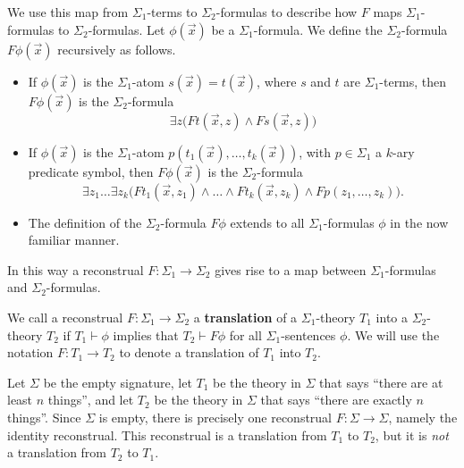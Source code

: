 We use this map from $\Sigma_1$-terms to $\Sigma_2$-formulas to
describe how $F$ maps $\Sigma_1$-formulas to $\Sigma_2$-formulas. Let
$\phi(\vec{x})$ be a $\Sigma_1$-formula. We define the
$\Sigma_2$-formula $F\phi(\vec{x})$ recursively as follows.
\begin{itemize}
\item If $\phi(\vec{x})$ is the $\Sigma_1$-atom $s(\vec{x})=t(\vec{x})$, where $s$ and $t$ are $\Sigma_1$-terms, then $F\phi(\vec{x})$ is the $\Sigma_2$-formula
$$
\exists z\big(Ft(\vec{x}, z)\land Fs(\vec{x}, z)\big)
$$

\item If $\phi(\vec{x})$ is the $\Sigma_1$-atom
  $p(t_1(\vec{x}),\ldots, t_k(\vec{x}))$, with $p\in\Sigma_1$ a
  $k$-ary predicate symbol, then $F\phi(\vec{x})$ is the
  $\Sigma_2$-formula
  \[ \exists z_1\ldots\exists z_k\big(Ft_1(\vec{x},
    z_1)\land\ldots\land Ft_k(\vec{x}, z_k)\land Fp(z_1,\ldots,
    z_k)\big) .\]

\item The definition of the $\Sigma_2$-formula $F\phi$ extends to all
  $\Sigma_1$-formulas $\phi$ in the now familiar manner.
\end{itemize}
In this way a reconstrual $F:\Sigma _1\rightarrow\Sigma _2$ gives rise
to a map between $\Sigma _1$-formulas and $\Sigma _2$-formulas.

\begin{defn} We call a reconstrual $F:\Sigma _1\rightarrow\Sigma _2$ a
  \textbf{translation} of a $\Sigma _1$-theory $T_1$ into a
  $\Sigma _2$-theory $T_2$ if $T_1\vdash\phi$ implies that
  $T_2\vdash F\phi$ for all $\Sigma _1$-sentences $\phi$. We will use
  the notation $F:T_1\rightarrow T_2$ to denote a translation of $T_1$
  into $T_2$.  \end{defn}




\begin{example} Let $\Sigma$ be the empty signature, let $T_1$ be the
  theory in $\Sigma$ that says ``there are at least $n$ things'', and
  let $T_2$ be the theory in $\Sigma$ that says ``there are exactly
  $n$ things''.  Since $\Sigma$ is empty, there is precisely one
  reconstrual $F:\Sigma\to\Sigma$, namely the identity reconstrual.
  This reconstrual is a translation from $T_1$ to $T_2$, but it is
  \textit{not} a translation from $T_2$ to $T_1$.  \end{example}

